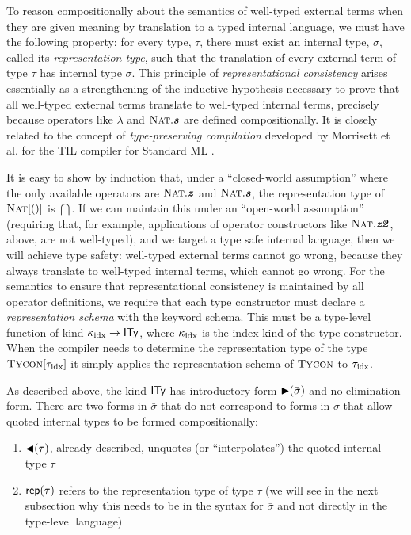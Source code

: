 \documentclass[9pt,preprint]{sigplanconf}
\begin{document}
To reason compositionally about the semantics of well-typed external terms when they are given meaning by translation to a typed internal language, we must have the following property: for every  type, $\tau$, there must exist an internal type, $\sigma$, called its \emph{representation type}, such that the translation of every external term of type $\tau$ has internal type $\sigma$. This principle of \emph{representational consistency} arises essentially as a strengthening of the inductive hypothesis necessary to prove that all well-typed external terms translate to well-typed internal terms, precisely because operators like $\lambda$ and $\textsc{Nat}.\textbf{\textit{s}}$ are defined compositionally. It is closely related to the concept of \emph{type-preserving compilation} developed by Morrisett et al. for the TIL compiler for Standard ML \cite{TIL}. %

It is easy to show by induction that, under a ``closed-world assumption'' where the only available operators are $\textsc{Nat}.\textbf{\textit{z}}$ and $\textsc{Nat}.\textbf{\textit{s}}$, the representation type of $\textsc{Nat}[()]$ is $\dint$. If we can maintain this under an ``open-world assumption'' (requiring that, for example, applications of operator constructors like $\textsc{Nat}.\textbf{\textit{z2}}$, above, are not well-typed), and we target a type safe internal language, then we will achieve type safety: well-typed external terms cannot go wrong, because they always translate to well-typed internal terms, which cannot go wrong. For the semantics to ensure that representational consistency is maintained by all operator definitions, we require that each type constructor must declare a \emph{representation schema} with the keyword \textsf{schema}. This must be a type-level function of kind $\kappa_{\text{idx}}\rightarrow{\textsf{ITy}}$, where $\kappa_{\text{idx}}$ is the index kind of the type constructor. When the compiler needs to determine the representation type of the type $\textsc{Tycon}[{\tau_{\text{idx}}}]$ it simply applies the representation schema of $\textsc{Tycon}$ to ${{\tau_{\text{idx}}}}$.

As described above, the kind $\textsf{ITy}$ has introductory form ${\blacktriangleright}(\bar \sigma)$ and no elimination form. There are two forms in $\bar \sigma$ that do not correspond to forms in $\sigma$ that allow quoted internal types to be formed compositionally:
\begin{enumerate}
\item ${\blacktriangleleft}(\tau)$, already described, unquotes (or ``interpolates'') the quoted internal type $\tau$
\item ${\sf rep}(\tau)$ refers to the representation type of type $\tau$ (we will see in the next subsection why this needs to be in the syntax for $\bar \sigma$ and not directly in the type-level language)
\end{enumerate}
\end{document}
